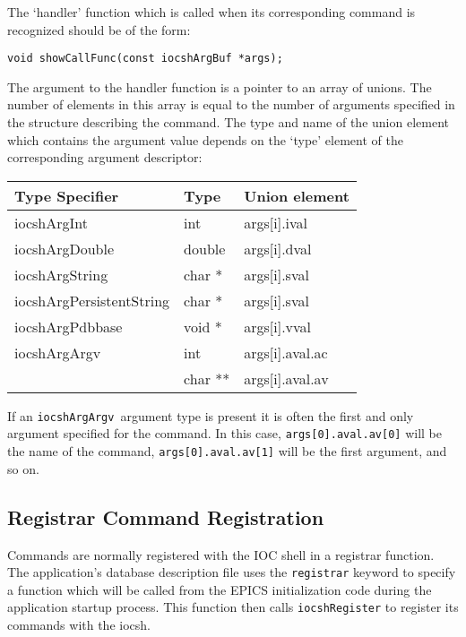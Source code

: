 The `handler' function which is called when its corresponding command is recognized should be of the form:

\begin{verbatim}
void showCallFunc(const iocshArgBuf *args);
\end{verbatim}

The argument to the handler function is a pointer to an array of unions.  The number of elements in this array is equal to 
the number of arguments specified in the structure describing the command.  The type and name of the union element 
which contains the argument value depends on the `type' element of the corresponding argument descriptor:

\begin{center}
\begin{longtable}
{p{1.45833in}p{0.56in}p{1.19in}}
Type Specifier & Type & Union element\\
\hline
iocshArgInt & int & args[i].ival\\
iocshArgDouble & double & args[i].dval\\
iocshArgString  & char * & args[i].sval\\
iocshArgPersistentString & char * & args[i].sval\\
iocshArgPdbbase & void * & args[i].vval\\
iocshArgArgv & int & args[i].aval.ac \\
 & char ** & args[i].aval.av
\end{longtable}
\end{center}

If an \verb|iocshArgArgv |argument type is present it is often the first and only argument specified for the command.  In this 
case, \verb|args[0].aval.av[0]| will be the name of the command,  \verb|args[0].aval.av[1]| will be the first argument, 
and so on.

\subsection{Registrar Command Registration}

Commands are normally registered with the IOC shell in a registrar function. The application's database description file 
uses the \verb|registrar| keyword to specify a function which will be called from the EPICS initialization code during the 
application startup process.  This function then calls \verb|iocshRegister| to register its commands with the iocsh.

